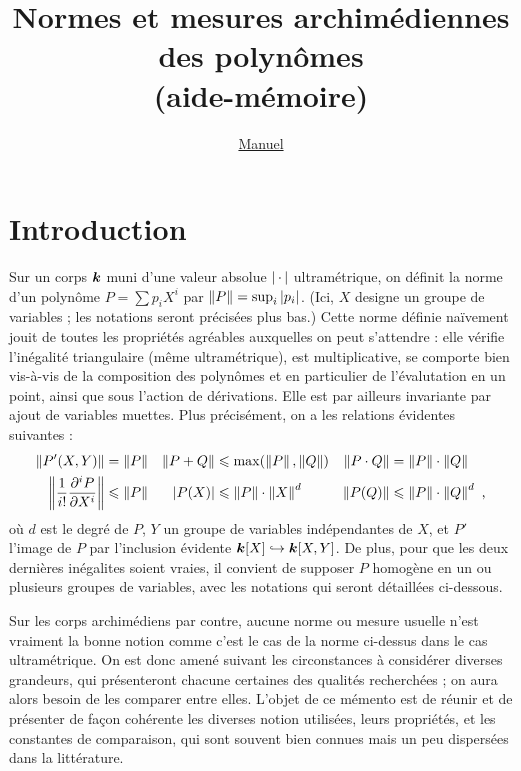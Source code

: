 \documentclass[11pt, twoside, a4paper]{article}
\author{\href{http://math.jussieu.fr/~mpg/}{Manuel \bsc{Pégourié-Gonnard}}}
\title{Normes et mesures archimédiennes des polynômes \\ (aide-mémoire)}
\begin{document}
\maketitle

\section*{Introduction}

Sur un corps $\boldsymbol{k}$ muni d'une valeur absolue $\left\lvert{\,\cdot\,}\right\rvert$ ultramétrique, on
définit la norme d'un polynôme $P = \sum p_i X^i$ par $\left\lVert P\right\rVert = \sup_i
\left\lvert p_i\right\rvert$. (Ici, $X$ designe un groupe de variables ; les notations seront
précisées plus bas.) Cette norme définie naïvement jouit de toutes les
propriétés agréables auxquelles on peut s'attendre : elle vérifie l'inégalité
triangulaire (même ultramétrique), est multiplicative, se comporte bien
vis-à-vis de la composition des polynômes et en particulier de l'évalutation
en un point, ainsi que sous l'action de dérivations. Elle est par ailleurs
invariante par ajout de variables muettes. Plus précisément, on a les
relations évidentes suivantes :
\begin{align*}
  \left\lVert P'(X, Y)\right\rVert &= \left\lVert P\right\rVert 	
  & \left\lVert P+Q\right\rVert &\leqslant \max(\left\lVert P\right\rVert, \left\lVert Q\right\rVert)	
  & \left\lVert P\cdot Q\right\rVert &= \left\lVert P\right\rVert \cdot \left\lVert Q\right\rVert  \\
  \left\lVert\frac{1}{i!}\frac{\partial^i P}{\partial X^i}\right\rVert &\leqslant \left\lVert P\right\rVert 
  & \left\lvert P(X)\right\rvert &\leqslant \left\lVert P\right\rVert \cdot \left\lVert X\right\rVert^d 	
  & \left\lVert P(Q)\right\rVert &\leqslant \left\lVert P\right\rVert \cdot \left\lVert Q\right\rVert^d  \text{ ,}
\end{align*}
où $d$ est le degré de $P$, $Y$ un groupe de variables indépendantes de $X$,
et $P'$ l'image de $P$ par l'inclusion évidente $\boldsymbol{k}[X] \hookrightarrow
\boldsymbol{k}[X, Y]$. De plus, pour que les deux dernières inégalites soient vraies, il
convient de supposer $P$ homogène en un ou plusieurs groupes de variables,
avec les notations qui seront détaillées ci-dessous.

Sur les corps archimédiens par contre, aucune norme ou mesure usuelle n'est
vraiment \og la\fg{} bonne notion comme c'est le cas de la norme ci-dessus
dans le cas ultramétrique. On est donc amené suivant les circonstances à
considérer diverses grandeurs, qui présenteront chacune certaines des qualités
recherchées ; on aura alors besoin de les comparer entre elles. L'objet de ce
mémento est de réunir et de présenter de façon cohérente les diverses notion
utilisées, leurs propriétés, et les constantes de comparaison, qui sont
souvent bien connues mais un peu dispersées dans la littérature.
\end{document}
